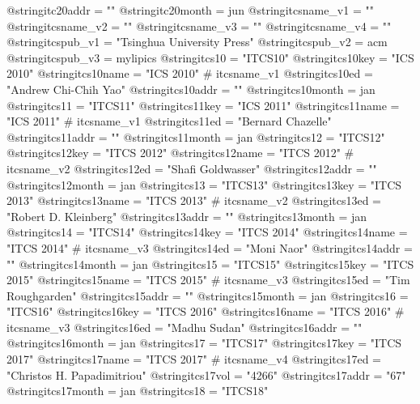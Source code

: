 @string{itc20addr =             ""}
@string{itc20month =            jun}
@string{itcsname_v1 =           ""}
@string{itcsname_v2 =           ""}
@string{itcsname_v3 =           ""}
@string{itcsname_v4 =           ""}
@string{itcspub_v1 =            "Tsinghua University Press"}
@string{itcspub_v2 =            acm}
@string{itcspub_v3 =            mylipics}
@string{itcs10 =                "ITCS10"}
@string{itcs10key =             "ICS 2010"}
@string{itcs10name =            "ICS 2010" # itcsname_v1}
@string{itcs10ed =              "Andrew Chi-Chih Yao"}
@string{itcs10addr =            ""}
@string{itcs10month =           jan}
@string{itcs11 =                "ITCS11"}
@string{itcs11key =             "ICS 2011"}
@string{itcs11name =            "ICS 2011" # itcsname_v1}
@string{itcs11ed =              "Bernard Chazelle"}
@string{itcs11addr =            ""}
@string{itcs11month =           jan}
@string{itcs12 =                "ITCS12"}
@string{itcs12key =             "ITCS 2012"}
@string{itcs12name =            "ITCS 2012" # itcsname_v2}
@string{itcs12ed =              "Shafi Goldwasser"}
@string{itcs12addr =            ""}
@string{itcs12month =           jan}
@string{itcs13 =                "ITCS13"}
@string{itcs13key =             "ITCS 2013"}
@string{itcs13name =            "ITCS 2013" # itcsname_v2}
@string{itcs13ed =              "Robert D. Kleinberg"}
@string{itcs13addr =            ""}
@string{itcs13month =           jan}
@string{itcs14 =                "ITCS14"}
@string{itcs14key =             "ITCS 2014"}
@string{itcs14name =            "ITCS 2014" # itcsname_v3}
@string{itcs14ed =              "Moni Naor"}
@string{itcs14addr =            ""}
@string{itcs14month =           jan}
@string{itcs15 =                "ITCS15"}
@string{itcs15key =             "ITCS 2015"}
@string{itcs15name =            "ITCS 2015" # itcsname_v3}
@string{itcs15ed =              "Tim Roughgarden"}
@string{itcs15addr =            ""}
@string{itcs15month =           jan}
@string{itcs16 =                "ITCS16"}
@string{itcs16key =             "ITCS 2016"}
@string{itcs16name =            "ITCS 2016" # itcsname_v3}
@string{itcs16ed =              "Madhu Sudan"}
@string{itcs16addr =            ""}
@string{itcs16month =           jan}
@string{itcs17 =                "ITCS17"}
@string{itcs17key =             "ITCS 2017"}
@string{itcs17name =            "ITCS 2017" # itcsname_v4}
@string{itcs17ed =              "Christos H. Papadimitriou"}
@string{itcs17vol =             "4266"}
@string{itcs17addr =            "67"}
@string{itcs17month =           jan}
@string{itcs18 =                "ITCS18"}
